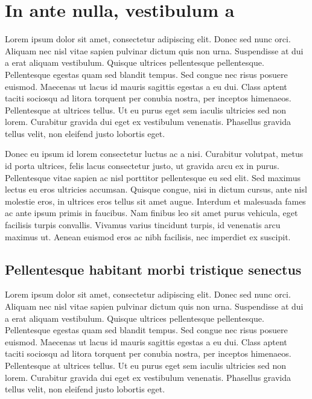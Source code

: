 \chapter{In ante nulla, vestibulum a}
\label{cha:intro}

Lorem ipsum dolor sit amet, consectetur adipiscing elit. Donec sed nunc orci. Aliquam nec nisl vitae sapien pulvinar dictum quis non urna. Suspendisse at dui a erat aliquam vestibulum. Quisque ultrices pellentesque pellentesque. Pellentesque egestas quam sed blandit tempus. Sed congue nec risus posuere euismod. Maecenas ut lacus id mauris sagittis egestas a eu dui. Class aptent taciti sociosqu ad litora torquent per conubia nostra, per inceptos himenaeos. Pellentesque at ultrices tellus. Ut eu purus eget sem iaculis ultricies sed non lorem. Curabitur gravida dui eget ex vestibulum venenatis. Phasellus gravida tellus velit, non eleifend justo lobortis eget.
\cite{coulouris}

Donec eu ipsum id lorem consectetur luctus ac a nisi. Curabitur volutpat, metus id porta ultrices, felis lacus consectetur justo, ut gravida arcu ex in purus. Pellentesque vitae sapien ac nisl porttitor pellentesque eu sed elit. Sed maximus lectus eu eros ultricies accumsan. Quisque congue, nisi in dictum cursus, ante nisl molestie eros, in ultrices eros tellus sit amet augue. Interdum et malesuada fames ac ante ipsum primis in faucibus. Nam finibus leo sit amet purus vehicula, eget facilisis turpis convallis. Vivamus varius tincidunt turpis, id venenatis arcu maximus ut. Aenean euismod eros ac nibh facilisis, nec imperdiet ex suscipit.
\cite{dalal}

\section{Pellentesque habitant morbi tristique senectus}
\label{sec:context}

Lorem ipsum dolor sit amet, consectetur adipiscing elit. Donec sed nunc orci. Aliquam nec nisl vitae sapien pulvinar dictum quis non urna. Suspendisse at dui a erat aliquam vestibulum. Quisque ultrices pellentesque pellentesque. Pellentesque egestas quam sed blandit tempus. Sed congue nec risus posuere euismod. Maecenas ut lacus id mauris sagittis egestas a eu dui. Class aptent taciti sociosqu ad litora torquent per conubia nostra, per inceptos himenaeos. Pellentesque at ultrices tellus. Ut eu purus eget sem iaculis ultricies sed non lorem. Curabitur gravida dui eget ex vestibulum venenatis. Phasellus gravida tellus velit, non eleifend justo lobortis eget.
\cite{ictbusiness}
\cite{donoho}

